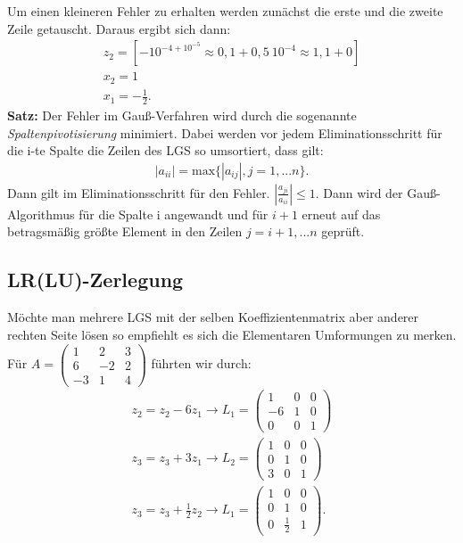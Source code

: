 \documentclass{scrartcl}
\begin{document}
Um einen kleineren Fehler zu erhalten werden zunächst die erste und die zweite Zeile getauscht. Daraus ergibt sich dann:
\begin{align*}
z_2=[-10^{-4+10^{-5}} \approx 0,1+0,5\ 10^{-4} \approx 1, 1+0]\\
x_2=1 \\
x_1=- \frac{1}{2}.
\end{align*}
\textbf{Satz:} Der Fehler im Gauß-Verfahren wird durch die sogenannte \textit{Spaltenpivotisierung} minimiert. Dabei werden vor jedem Eliminationsschritt für die i-te Spalte die Zeilen des LGS so umsortiert, dass gilt:
\begin{align*}
|a_{ii}|= \text{max}\{|a_{ij}|, j=1,...n \}.
\end{align*}
Dann gilt im Eliminationsschritt für den Fehler. $|\frac{a_{ji}}{a_{ii}}|\leq 1$.
Dann wird der Gauß-Algorithmus für die Spalte i angewandt und für $i+1$ erneut auf das betragsmäßig größte Element in den Zeilen $j=i+1,...n$
geprüft.

\subsection{LR(LU)-Zerlegung}
Möchte man mehrere LGS mit der selben Koeffizientenmatrix aber anderer rechten Seite lösen so empfiehlt es sich die Elementaren Umformungen zu merken. \\ 
Für $A= \begin{pmatrix}
1  & 2 & 3\\
6  & -2 & 2\\
-3  &1 & 4
\end{pmatrix}$
führten wir durch:\\
\begin{align*} 
 z_2=z_2-6z_1 \rightarrow L_1=\begin{pmatrix}
1  & 0 & 0\\
-6  & 1 & 0\\
0  &0 & 1
\end{pmatrix} \\
z_3=z_3+3z_1 \rightarrow L_2=\begin{pmatrix}
1  & 0 & 0\\
0  & 1 & 0\\
3  &0 & 1 
\end{pmatrix} \\
z_3=z_3+\frac{1}{2} z_2 \rightarrow L_1=\begin{pmatrix}
1  & 0 & 0\\
0  & 1 & 0\\
0  &\frac{1}{2} & 1
\end{pmatrix}.
\end{align*}
\end{document}
